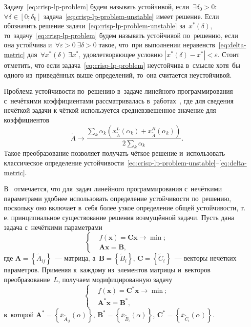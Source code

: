 Задачу~\eqref{eq:crisp-lp-problem} будем называть устойчивой, если~$\exists \delta_0 > 0$: $\forall \delta \in \left[ 0; \delta_0 \right]$  задача~\eqref{eq:crisp-lp-problem-unstable} имеет решение. Если обозначить решение задачи~\eqref{eq:crisp-lp-problem-unstable} за~$x^{*} \left(\delta \right)$, то~задачу~\eqref{eq:crisp-lp-problem} будем называть устойчивой по~решению, если она устойчива и~$\forall \varepsilon>0\ \exists \delta > 0$ такое, что~при выполнении неравенств~\eqref{eq:delta-metric} для~$\forall x^{*} \left(\delta \right)\ \exists x^{*}$, удовлетворяющее условию $\left| x^{*}\left(\delta \right)- x^{*} \right| < \varepsilon$. Стоит отметить, что если задача~\eqref{eq:crisp-lp-problem} неустойчива в~смысле хотя~бы одного из~приведённых выше определений, то~она считается неустойчивой.

Проблема устойчивости по~решению в~задаче линейного программирования с~нечёткими коэффициентами рассматривалась в~работах~\cite{Matveev_Starodubtsev, PhD_Starodubtsev}, где для сведения нечёткой задачи к чёткой используется средневзвешенное значение для коэффициентов
\begin{equation*}
  \tilde A \to \frac{\sum \limits_k \alpha_k \left( x^L_{\tilde A} \left( \alpha_k \right) + x^R_{\tilde A} \left( \alpha_k \right) \right) }{2 \sum \limits_k \alpha_k }.
\end{equation*}
Такое преобразование позволяет получать чёткое решение и~использовать классическое определение устойчивости~\eqref{eq:crisp-lp-problem-unstable}--\eqref{eq:delta-metric}.

В~\cite{Vorontsov_VSTU} отмечается, что для~задач линейного программирования с~нечёткими параметрами удобнее использовать определение устойчивости по~решению, поскольку оно включает в~себя более узкое определение общей устойчивости, т.\,е. принципиальное существование решения возмущённой задачи. Пусть дана задача с~нечёткими параметрами
\begin{equation*}
  \left\{ \begin{aligned}
    & f\left( \mathbf{x} \right)=\mathbf{Cx}\to \min;  \\ 
    & \mathbf{Ax}=\mathbf{B},
  \end{aligned} \right.
\end{equation*}
где $\mathbf{A}=\left\{ \tilde{A}_{ij} \right\}$~--- матрица, а~$\mathbf{B}=\left\{ \tilde{B}_i \right\}$, $\mathbf{C}=\left\{\tilde{C}_i \right\}$~--- векторы нечётких параметров. Применяя к~каждому из~элементов матрицы и~векторов преобразование~$L$, получаем модифицированную задачу
\begin{equation}
\label{eq:fuzzy-lp-unstable-problem}
  \left\{ \begin{aligned}
    & f\left( \mathbf{x} \right)={\mathbf{C}^{*}}\mathbf{x}\to \min;  \\ 
    & {\mathbf{A}^{*}}\mathbf{x}={\mathbf{B}}^{*},
  \end{aligned} \right.
\end{equation}
в~которой $\mathbf{A}^{*}=\left\{ \bar{x}_{\tilde{A}_{ij}}\left(\alpha \right) \right\}$, $\mathbf{B}^{*}=\left\{ \bar{x}_{\tilde{B}_i}\left(\alpha \right) \right\}$, $\mathbf{C}^{*}=\left\{ \bar{x}_{\tilde{C}_i}\left(\alpha \right) \right\}$.

